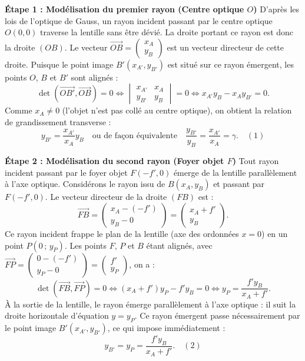 \documentclass[11pt,a4paper]{article}
\newcommand{\vect}[1]{\overrightarrow{#1}}
\renewcommand{\det}{\operatorname{det}}
\begin{document}
\begin{correctionbox}
\textbf{Étape 1 : Modélisation du premier rayon (Centre optique $O$)}
D'après les lois de l'optique de Gauss, un rayon incident passant par le centre optique $O(0, 0)$ traverse la lentille sans être dévié.
La droite portant ce rayon est donc la droite $(OB)$.
Le vecteur $\vect{OB} = \begin{pmatrix} x_A \\ y_B \end{pmatrix}$ est un vecteur directeur de cette droite.
Puisque le point image $B'(x_{A'}, y_{B'})$ est situé sur ce rayon émergent, les points $O$, $B$ et $B'$ sont alignés :
\[
\det(\vect{OB'}, \vect{OB}) = 0 \iff \begin{vmatrix} x_{A'} & x_A \\ y_{B'} & y_B \end{vmatrix} = 0 \iff x_{A'} y_B - x_A y_{B'} = 0.
\]
Comme $x_A \neq 0$ (l'objet n'est pas collé au centre optique), on obtient la relation de grandissement transverse :
\[
y_{B'} = \frac{x_{A'}}{x_A} y_B \quad \text{ou de façon équivalente} \quad \frac{y_{B'}}{y_B} = \frac{x_{A'}}{x_A} = \gamma. \quad (1)
\]

\textbf{Étape 2 : Modélisation du second rayon (Foyer objet $F$)}
Tout rayon incident passant par le foyer objet $F(-f', 0)$ émerge de la lentille parallèlement à l'axe optique.
Considérons le rayon issu de $B(x_A, y_B)$ et passant par $F(-f', 0)$.
Le vecteur directeur de la droite $(FB)$ est :
\[
\vect{FB} = \begin{pmatrix} x_A - (-f') \\ y_B - 0 \end{pmatrix} = \begin{pmatrix} x_A + f' \\ y_B \end{pmatrix}.
\]
Ce rayon incident frappe le plan de la lentille (axe des ordonnées $x = 0$) en un point $P(0\,;\,y_P)$.
Les points $F$, $P$ et $B$ étant alignés, avec $\vect{FP} = \begin{pmatrix} 0 - (-f') \\ y_P - 0 \end{pmatrix} = \begin{pmatrix} f' \\ y_P \end{pmatrix}$, on a :
\[
\det(\vect{FB}, \vect{FP}) = 0 \iff (x_A + f') y_P - f' y_B = 0 \iff y_P = \frac{f' y_B}{x_A + f'}.
\]
À la sortie de la lentille, le rayon émerge parallèlement à l'axe optique : il suit la droite horizontale d'équation $y = y_P$.
Ce rayon émergent passe nécessairement par le point image $B'(x_{A'}, y_{B'})$, ce qui impose immédiatement :
\[
y_{B'} = y_P = \frac{f' y_B}{x_A + f'}. \quad (2)
\]


\end{correctionbox}
\end{document}
